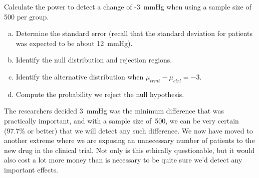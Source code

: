 \begin{exercisewrap}
\begin{nexercise}
Calculate the power to detect a change of -3~mmHg when using
a sample size of 500 per group.\footnotemark{}
\begin{enumerate}[(a)]
\setlength{\itemsep}{0mm}
\item
    Determine the standard error (recall that the standard
    deviation for patients was expected to be about 12~mmHg).
\item
    Identify the null distribution and rejection regions.
\item
    Identify the alternative distribution when
    $\mu_{trmt} - \mu_{ctrl} = -3$.
\item
    Compute the probability we reject the null hypothesis.
\end{enumerate}
\end{nexercise}
\end{exercisewrap}

The researchers decided 3~mmHg was the minimum difference
that was practically important, and with a sample size of~500,
we can be very certain (97.7\% or better) that we will detect
any such difference.
We now have moved to another extreme where we are exposing
an unnecessary number of patients to the new drug in the
clinical trial.
Not only is this ethically questionable, but it would also
cost a lot more money than is necessary to be quite sure
we'd detect any important effects.

